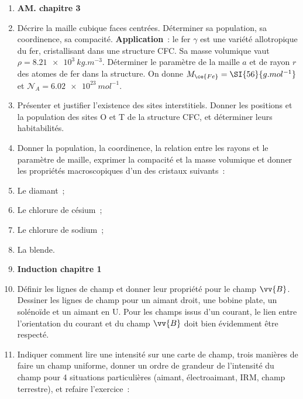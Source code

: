 \documentclass[a4paper, 11pt, final, garamond]{book}
\begin{document}
\begin{enumerate}[label=\sqenumi]
	\item[] \textbf{AM. chapitre 3}


	\item Décrire la maille cubique faces centrées. Déterminer sa population, sa
	      coordinence, sa compacité. \textbf{Application}~: le fer $\gamma$ est une
	      variété allotropique du fer, cristallisant dans une structure CFC. Sa masse
	      volumique vaut $\rho = \SI{8.21e3}{kg.m^{-3}}$. Déterminer le paramètre de
	      la maille $a$ et de rayon $r$ des atomes de fer dans la structure. On donne
	      $M_{\ce{Fe}} = \SI{56}{g.mol^{-1}}$ et $\mathcal{N}_A =
		      \SI{6.02e23}{mol^{-1}}$.

	\item Présenter et justifier l'existence des sites interstitiels. Donner les
	      positions et la population des sites O et T de la structure CFC, et déterminer
	      leurs habitabilités.

	      \bigbreak

	\item[] Donner la population, la coordinence, la relation entre les rayons et
		le paramètre de maille, exprimer la compacité et la masse volumique et
		donner les propriétés macroscopiques d'un des cristaux suivants~:

	\item Le diamant~;
	\item Le chlorure de césium~;
	\item Le chlorure de sodium~;
	\item La blende.

	\item[] \textbf{Induction chapitre 1}

	\item Définir les lignes de champ et donner leur propriété pour le champ
	      $\vv{B}$. Dessiner les lignes de champ pour un aimant droit, une bobine
	      plate, un solénoïde et un aimant en U. Pour les champs issus d'un courant,
	      le lien entre l'orientation du courant et du champ $\vv{B}$ doit bien
	      évidemment être respecté.

	\item Indiquer comment lire une intensité sur une carte de champ, trois
	      manières de faire un champ uniforme, donner un ordre de grandeur de
	      l'intensité du champ pour 4 situations particulières (aimant, électroaimant,
	      IRM, champ terrestre), et refaire l'exercice~:
\end{enumerate}
\end{document}
